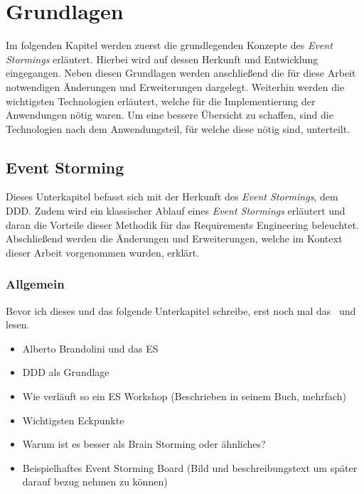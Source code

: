 \chapter{Grundlagen}\label{ch:technologien}
Im folgenden Kapitel werden zuerst die grundlegenden Konzepte des \textit{Event Stormings} erläutert.
Hierbei wird auf dessen Herkunft und Entwicklung eingegangen.
Neben diesen Grundlagen werden anschließend die für diese Arbeit notwendigen Änderungen und Erweiterungen dargelegt.
Weiterhin werden die wichtigsten Technologien erläutert, welche für die Implementierung der Anwendungen nötig waren.
Um eine bessere Übersicht zu schaffen, sind die Technologien nach dem Anwendungsteil, für welche diese nötig sind, unterteilt.

\section{Event Storming}\label{sec:event-storming}
Dieses Unterkapitel befasst sich mit der Herkunft des \textit{Event Stormings}, dem \ac*{DDD}.
Zudem wird ein klassischer Ablauf eines \textit{Event Stormings} erläutert und daran die Vorteile dieser Methodik für das Requirements Engineering beleuchtet.
Abschließend werden die Änderungen und Erweiterungen, welche im Kontext dieser Arbeit vorgenommen wurden, erklärt.

\subsection{Allgemein}\label{subsec:allgemein}
\todo Bevor ich dieses und das folgende Unterkapitel schreibe, erst noch mal das~\cite*{dddd} und~\cite*{introES} lesen.
\begin{itemize}
    \item Alberto Brandolini und das ES
    \item DDD als Grundlage
    \item Wie verläuft so ein ES Workshop (Beschrieben in seinem Buch, mehrfach)
    \item Wichtigsten Eckpunkte
    \item Warum ist es besser als Brain Storming oder ähnliches?
    \item Beispielhaftes Event Storming Board (Bild und beschreibungstext um später darauf bezug nehmen zu können)
\end{itemize}

